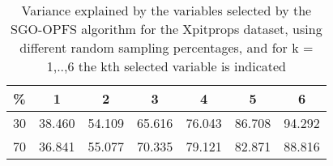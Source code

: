\begin{table}
	\begin{center}
		\begin{tabular}{c c c c c c c}
			\% & 1 & 2 & 3 & 4 & 5 & 6 \\
			\hline
			30 & 38.460 & 54.109 & 65.616 & 76.043 & 86.708 & 94.292 \\
			70 & 36.841 & 55.077 & 70.335 & 79.121 & 82.871 & 88.816 \\
		\end{tabular}
	\end{center}
	\caption{Variance explained by the variables selected by the SGO-OPFS algorithm for the Xpitprops dataset, using different random sampling percentages, and for k = 1,..,6 the kth selected variable is indicated}
\end{table}